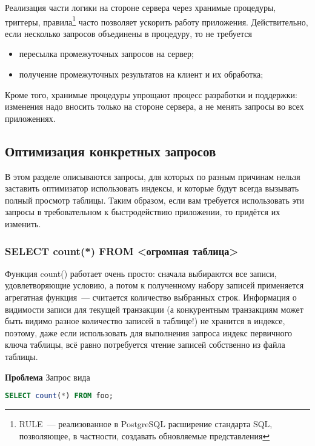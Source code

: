 Реализация части логики на стороне сервера через хранимые процедуры, триггеры, правила\footnote{RULE~--- реализованное в PostgreSQL расширение стандарта SQL, позволяющее, в частности, создавать обновляемые представления} часто позволяет ускорить работу приложения. Действительно, если несколько запросов объединены в процедуру, то не требуется

\begin{itemize}
  \item пересылка промежуточных запросов на сервер;
  \item получение промежуточных результатов на клиент и их обработка;
\end{itemize}

Кроме того, хранимые процедуры упрощают процесс разработки и поддержки: изменения надо вносить только на стороне сервера, а не менять запросы во всех приложениях.

\subsection{Оптимизация конкретных запросов}
\label{sec:pg-optimize-sql}

В этом разделе описываются запросы, для которых по разным причинам нельзя заставить оптимизатор использовать индексы, и которые будут всегда вызывать полный просмотр таблицы. Таким образом, если вам требуется использовать эти запросы в требовательном к быстродействию приложении, то придётся их изменить.

\subsubsection{SELECT count(*) FROM <огромная таблица>}

Функция count() работает очень просто: сначала выбираются все записи, удовлетворяющие условию, а потом к полученному набору записей применяется агрегатная функция~--- считается количество выбранных строк. Информация о видимости записи для текущей транзакции (а конкурентным транзакциям может быть видимо разное количество записей в таблице!) не хранится в индексе, поэтому, даже если использовать для выполнения запроса индекс первичного ключа таблицы, всё равно потребуется чтение записей собственно из файла таблицы.

\textbf{Проблема} Запрос вида

\begin{lstlisting}[language=SQL,label=lst:sql_performance1,caption=SQL]
SELECT count(*) FROM foo;
\end{lstlisting}

